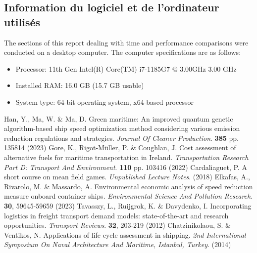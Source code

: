 \documentclass[a4paper,12pt]{article}
\begin{document}
\subsection*{Information du logiciel et de l'ordinateur utilisés}
The sections of this report dealing with time and performance comparisons were conducted on a desktop computer. The computer specifications are as follows:

\begin{itemize}
	\item Processor: 11th Gen Intel(R) Core(TM) i7-1185G7 @ 3.00GHz 3.00 GHz
	\item Installed RAM: 16.0 GB (15.7 GB usable)
	\item System type: 64-bit operating system, x64-based processor
\end{itemize}

\begin{thebibliography}{2}
	Han, Y., Ma, W. \& Ma, D. Green maritime: An improved quantum genetic algorithm-based ship speed optimization method considering various emission reduction regulations and strategies. {\em Journal Of Cleaner Production}. \textbf{385} pp. 135814 (2023)
	Gore, K., Rigot-Müller, P. \& Coughlan, J. Cost assessment of alternative fuels for maritime transportation in Ireland. {\em Transportation Research Part D: Transport And Environment}. \textbf{110} pp. 103416 (2022)
	Cardaliaguet, P. A short course on mean field games. {\em Unpublished Lecture Notes}. (2018)
	Elkafas, A., Rivarolo, M. \& Massardo, A. Environmental economic analysis of speed reduction measure onboard container ships. {\em Environmental Science And Pollution Research}. \textbf{30}, 59645-59659 (2023)
	Tavasszy, L., Ruijgrok, K. \& Davydenko, I. Incorporating logistics in freight transport demand models: state-of-the-art and research opportunities. {\em Transport Reviews}. \textbf{32}, 203-219 (2012)
	Chatzinikolaou, S. \& Ventikos, N. Applications of life cycle assessment in shipping. {\em 2nd International Symposium On Naval Architecture And Maritime, Istanbul, Turkey}. (2014)

\end{thebibliography}
\end{document}
